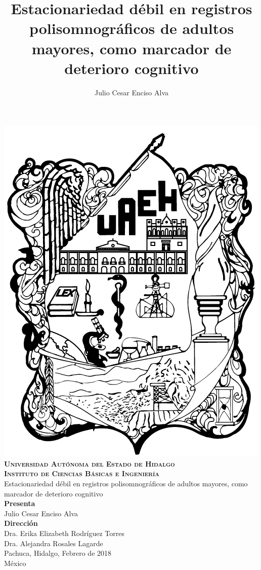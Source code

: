 \documentclass[12pt,letterpaper]{book}
\begin{document}
\setcounter{page}{0}
\thispagestyle{empty}

\title{Estacionariedad débil en registros polisomnográficos de adultos mayores,
como marcador de deterioro cognitivo}
\author{Julio Cesar Enciso Alva}

\begin{center}
    \includegraphics[width=0.2\linewidth]{./img_oficiales/logo_uaeh.png}\\
    
    {\large 
        \textbf{\textsc{
            Universidad Autónoma del Estado de Hidalgo\\
            Instituto de Ciencias Básicas e Ingeniería\\
        }}
    }
\vspace*{2.5em}
    {\huge
        Estacionariedad débil en registros polisomnográficos de adultos mayores,
        como marcador de deterioro cognitivo\\
    }
\vspace*{2.5em}
    {\large
        \textbf{Presenta}\\
    }
\vspace*{.25em}
    {\Large
        Julio Cesar Enciso Alva\\
    }
\vspace*{3em}
    {\large
        \textbf{Dirección}\\
    }
\vspace*{.25em}
    {\Large
        Dra. Erika Elizabeth Rodríguez Torres\\
        Dra. Alejandra Rosales Lagarde\\
    }
\vspace*{3em}
    {\large
        Pachuca, Hidalgo, Febrero de 2018\\
        M\'exico
    }
\end{center}

\newpage

\end{document}
